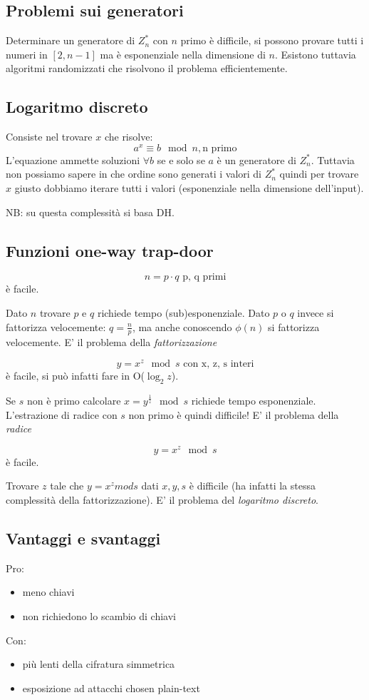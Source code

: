 \subsection{Problemi sui generatori}
Determinare un generatore di $Z_n^*$ con $n$ primo è difficile, si possono provare tutti i numeri in $[2, n-1]$ ma è esponenziale nella dimensione di $n$.
Esistono tuttavia algoritmi randomizzati che risolvono il problema efficientemente.

\subsection{Logaritmo discreto}
Consiste nel trovare $x$ che risolve:
$$ a^x \equiv b \mod n, \text{n primo} $$
L'equazione ammette soluzioni $\forall b$ se e solo se $a$ è un generatore di $Z_n^*$.
Tuttavia non possiamo sapere in che ordine sono generati i valori di $Z_n^*$ quindi per trovare $x$ giusto dobbiamo iterare tutti i valori (esponenziale nella dimensione dell'input).

NB: su questa complessità si basa DH.

\subsection{Funzioni one-way trap-door}
$$ n = p \cdot q \text{ p, q primi} $$
è facile.

Dato $n$ trovare $p$ e $q$ richiede tempo (sub)esponenziale. Dato $p$ o $q$ invece si fattorizza velocemente: $q = \frac{n}{p}$, ma anche conoscendo $\phi(n)$ si fattorizza velocemente. E' il problema della \emph{fattorizzazione}

$$ y = x^z \mod s \text{ con x, z, s interi} $$
è facile, si può infatti fare in O($\log_2z$).

Se $s$ non è primo calcolare $x = y^{\frac{1}{z}} \mod s$ richiede tempo esponenziale.
L'estrazione di radice con $s$ non primo è quindi difficile! E' il problema della \emph{radice}

$$y = x^z \mod s $$
è facile.

Trovare $z$ tale che $y = x^z mod s$ dati $x, y, s$ è difficile (ha infatti la stessa complessità della fattorizzazione). E' il problema del \emph{logaritmo discreto}.

\subsection{Vantaggi e svantaggi}
Pro:
\begin{itemize}
    \item meno chiavi
    \item non richiedono lo scambio di chiavi
\end{itemize}
Con:
\begin{itemize}
    \item più lenti della cifratura simmetrica
    \item esposizione ad attacchi chosen plain-text
\end{itemize}

